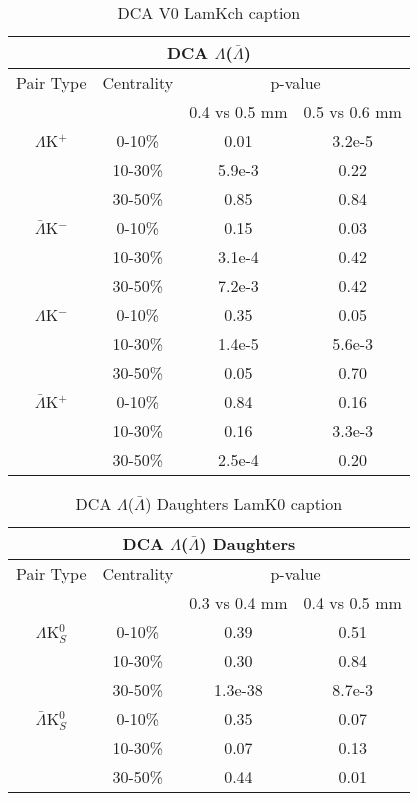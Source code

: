 \begin{table}
 \centering
 \begin{tabular}{|c|c|c|c|}
 \multicolumn{4}{c}{DCA $\Lambda$($\bar{\Lambda}$)} \\
  \hline
  Pair Type & Centrality & \multicolumn{2}{c|}{p-value} \\
  \cline{3-4}
   & & 0.4 vs 0.5 mm & 0.5 vs 0.6 mm \\
  \hline
  $\Lambda$K$^{+}$ & 0-10\% & 0.01 & 3.2e-5 \\
   & 10-30\% & 5.9e-3 & 0.22 \\
   & 30-50\% & 0.85 & 0.84 \\
  \hline
  $\bar{\Lambda}$K$^{-}$ & 0-10\% & 0.15 & 0.03 \\
   & 10-30\% & 3.1e-4 & 0.42 \\
   & 30-50\% & 7.2e-3 & 0.42 \\
  \hline \hline
  $\Lambda$K$^{-}$ & 0-10\% & 0.35 & 0.05 \\
   & 10-30\% & 1.4e-5 & 5.6e-3 \\
   & 30-50\% & 0.05 & 0.70 \\
  \hline
  $\bar{\Lambda}$K$^{+}$ & 0-10\% & 0.84 & 0.16 \\
   & 10-30\% & 0.16 & 3.3e-3 \\
   & 30-50\% & 2.5e-4 & 0.20 \\
  \hline
 \end{tabular}
 \caption{DCA V0 LamKch caption}
 \label{tab:V0DcaLamKch}
\end{table}


\begin{table}
 \centering
 \begin{tabular}{|c|c|c|c|}
 \multicolumn{4}{c}{DCA $\Lambda$($\bar{\Lambda}$) Daughters} \\
  \hline
  Pair Type & Centrality & \multicolumn{2}{c|}{p-value} \\
  \cline{3-4}
   & & 0.3 vs 0.4 mm & 0.4 vs 0.5 mm \\
  \hline
  $\Lambda$K$^{0}_{S}$ & 0-10\% & 0.39 & 0.51 \\
   & 10-30\% & 0.30 & 0.84 \\
   & 30-50\% & 1.3e-38 & 8.7e-3 \\
  \hline
  $\bar{\Lambda}$K$^{0}_{S}$ & 0-10\% & 0.35 & 0.07 \\
   & 10-30\% & 0.07 & 0.13 \\
   & 30-50\% & 0.44 & 0.01 \\
  \hline
 \end{tabular}
 \caption{DCA $\Lambda$($\bar{\Lambda}$) Daughters LamK0 caption}
 \label{tab:LamDaughtersDcaLamK0}
\end{table}

